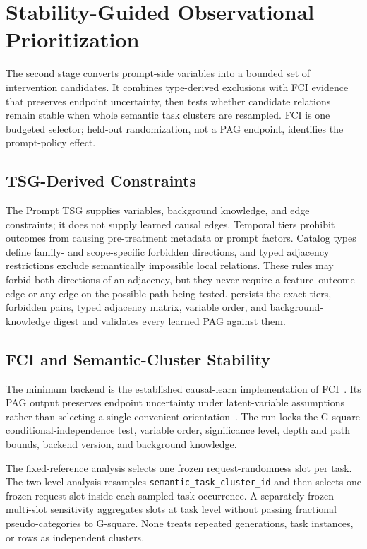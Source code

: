 \section{Stability-Guided Observational Prioritization}

The second stage converts prompt-side variables into a bounded set of
intervention candidates. It combines type-derived exclusions with FCI evidence
that preserves endpoint uncertainty, then tests whether candidate relations
remain stable when whole semantic task clusters are resampled. FCI is one
budgeted selector; held-out randomization, not a PAG endpoint, identifies the
prompt-policy effect.

\subsection{TSG-Derived Constraints}

The Prompt TSG supplies variables, background knowledge, and edge constraints;
it does not supply learned causal edges. Temporal tiers prohibit outcomes from
causing pre-treatment metadata or prompt factors. Catalog types define
family- and scope-specific forbidden directions, and typed adjacency
restrictions exclude semantically impossible local relations. These rules may
forbid both directions of an adjacency, but they never require a
feature--outcome edge or any edge on the possible path being tested. \model
persists the exact tiers, forbidden pairs, typed adjacency matrix, variable
order, and background-knowledge digest and validates every learned PAG against
them.

\subsection{FCI and Semantic-Cluster Stability}

The minimum backend is the established causal-learn implementation of
FCI~\cite{spirtes1995fci,zheng2024causallearn}. Its PAG output preserves
endpoint uncertainty under latent-variable assumptions rather than selecting a
single convenient orientation~\cite{zhang2008ancestral}. The run locks the
G-square conditional-independence test, variable order, significance level,
depth and path bounds, backend version, and background knowledge.

The fixed-reference analysis selects one frozen request-randomness slot per
task. The two-level analysis resamples \texttt{semantic\_task\_cluster\_id}
and then selects one frozen request slot inside each sampled task occurrence.
A separately frozen multi-slot sensitivity aggregates slots at task level
without passing fractional pseudo-categories to G-square. None treats repeated
generations, task instances, or rows as independent clusters.

